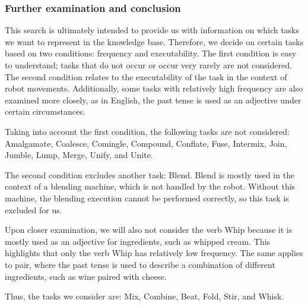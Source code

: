   \subsubsection*{Further examination and conclusion}
  This search is ultimately intended to provide us with information on which tasks we want to represent in the knowledge base. Therefore, we decide on certain tasks based on two conditions: frequency and executability. The first condition is easy to understand; tasks that do not occur or occur very rarely are not considered. The second condition relates to the executability of the task in the context of robot movements. Additionally, some tasks with relatively high frequency are also examined more closely, as in English, the past tense is used as an adjective under certain circumstances.

Taking into account the first condition, the following tasks are not considered: Amalgamate, Coalesce, Comingle, Compound, Conflate, Fuse, Intermix, Join, Jumble, Lump, Merge, Unify, and Unite.

The second condition excludes another task: Blend. Blend is mostly used in the context of a blending machine, which is not handled by the robot. Without this machine, the blending execution cannot be performed correctly, so this task is excluded for us.

Upon closer examination, we will also not consider the verb Whip because it is mostly used as an adjective for ingredients, such as whipped cream. This highlights that only the verb Whip has relatively low frequency. The same applies to pair, where the past tense is used to describe a combination of different ingredients, such as wine paired with cheese.

Thus, the tasks we consider are: Mix, Combine, Beat, Fold, Stir, and Whisk.


